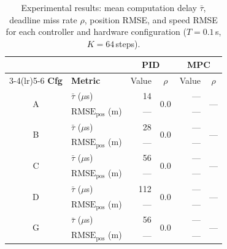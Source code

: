 \documentclass[conference]{IEEEtran}
\newcommand{\RMSE}{\mathrm{RMSE}}
\begin{document}
\begin{table}[t]
  \centering
  \caption{Experimental results: mean computation delay
    $\bar{\tau}$, deadline miss rate $\rho$, position RMSE,
    and speed RMSE for each controller and hardware
    configuration ($T = 0.1$\,s, $K = 64$\,steps).} 
  \label{tab:results}
  \footnotesize
  \renewcommand{\arraystretch}{1.15}
  \begin{tabular}{c l rr rr}
    \toprule
    & & \multicolumn{2}{c}{\textbf{PID}}
      & \multicolumn{2}{c}{\textbf{MPC}} \\
    \cmidrule(lr){3-4}\cmidrule(lr){5-6}
    \textbf{Cfg}
      & \textbf{Metric}
      & \multicolumn{1}{c}{Value}
      & \multicolumn{1}{c}{$\rho$}
      & \multicolumn{1}{c}{Value}
      & \multicolumn{1}{c}{$\rho$} \\
    \midrule
    \multirow{2}{*}{A}
      & $\bar{\tau}$ ($\mu$s)         & 14   & \multirow{2}{*}{0.0}
                                      & ---  & \multirow{2}{*}{---} \\
      & $\RMSE_{\text{pos}}$ (m)      & ---  &
                                      & ---  &  \\
    \midrule
    \multirow{2}{*}{B}
      & $\bar{\tau}$ ($\mu$s)         & 28   & \multirow{2}{*}{0.0}
                                      & ---  & \multirow{2}{*}{---} \\
      & $\RMSE_{\text{pos}}$ (m)      & ---  &
                                      & ---  &  \\
    \midrule
    \multirow{2}{*}{C}
      & $\bar{\tau}$ ($\mu$s)         & 56   & \multirow{2}{*}{0.0}
                                      & ---  & \multirow{2}{*}{---} \\
      & $\RMSE_{\text{pos}}$ (m)      & ---  &
                                      & ---  &  \\
    \midrule
    \multirow{2}{*}{D}
      & $\bar{\tau}$ ($\mu$s)         & 112  & \multirow{2}{*}{0.0}
                                      & ---  & \multirow{2}{*}{---} \\
      & $\RMSE_{\text{pos}}$ (m)      & ---  &
                                      & ---  &  \\
    \midrule
    \multirow{2}{*}{G}
      & $\bar{\tau}$ ($\mu$s)         & 56   & \multirow{2}{*}{0.0}
                                      & ---  & \multirow{2}{*}{---} \\
      & $\RMSE_{\text{pos}}$ (m)      & ---  &
                                      & ---  &  \\
    \bottomrule
  \end{tabular}
\end{table}
\end{document}
